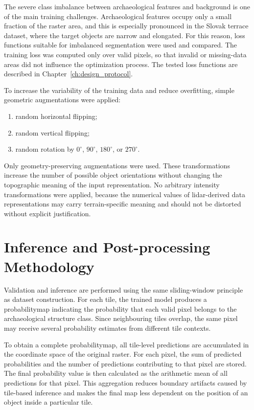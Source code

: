 The severe class imbalance between archaeological features and background is one of the main training challenges. Archaeological features occupy only a small fraction of the raster area, and this is especially pronounced in the Slovak terrace dataset, where the target objects are narrow and elongated. For this reason, loss functions suitable for imbalanced segmentation were used and compared. The training loss was computed only over valid pixels, so that invalid or missing-data areas did not influence the optimization process. The tested loss functions are described in Chapter~\ref{ch:design_protocol}.

To increase the variability of the training data and reduce overfitting, simple geometric augmentations were applied:
\begin{enumerate}
    \item random horizontal flipping;
    \item random vertical flipping;
    \item random rotation by $0^\circ$, $90^\circ$, $180^\circ$, or $270^\circ$.
\end{enumerate}

Only geometry-preserving augmentations were used. These transformations increase the number of possible object orientations without changing the topographic meaning of the input representation. No arbitrary intensity transformations were applied, because the numerical values of \gls{lidar}-derived data representations may carry terrain-specific meaning and should not be distorted without explicit justification.

\section{Inference and Post-processing Methodology}\label{sec:inference_postprocessing}

Validation and inference are performed using the same sliding-window principle as dataset construction. For each tile, the trained model produces a \gls{probabilitymap} indicating the probability that each valid pixel belongs to the archaeological structure class. Since neighbouring tiles overlap, the same pixel may receive several probability estimates from different tile contexts.

To obtain a complete \gls{probabilitymap}, all tile-level predictions are accumulated in the coordinate space of the original raster. For each pixel, the sum of predicted probabilities and the number of predictions contributing to that pixel are stored. The final probability value is then calculated as the arithmetic mean of all predictions for that pixel. This aggregation reduces boundary artifacts caused by tile-based inference and makes the final map less dependent on the position of an object inside a particular tile.

